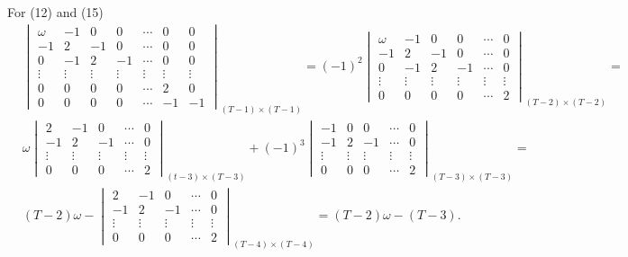 \documentclass[12pt,a4paper,hyperref]{article}
\begin{document}
For (12) and (15)
\begin{align*}
& \begin{vmatrix}
 \omega & -1     & 0      & 0      & \cdots  & 0 & 0\\
  -1    & 2      & -1     & 0      & \cdots  & 0 & 0\\
   0    & -1     & 2      & -1     &  \cdots & 0 &0 \\
\vdots  & \vdots & \vdots & \vdots & \vdots  & \vdots & \vdots \\
 0      & 0      & 0      & 0      & \cdots  & 2 &  0\\
 0      & 0      & 0      & 0      &  \cdots & -1 & -1
\end{vmatrix}
_{(T-1) \times (T-1)}
=   (-1)^{2}
\begin{vmatrix}
 \omega & -1     & 0      & 0      & \cdots  & 0  \\
  -1    & 2      & -1     & 0      & \cdots  & 0  \\
   0    & -1     & 2      & -1     &  \cdots &  0 \\
\vdots  & \vdots & \vdots & \vdots & \vdots  & \vdots  \\
 0      & 0      & 0      & 0      & \cdots  & 2
\end{vmatrix}
_{(T-2) \times (T-2)}
=  \\
& \omega
\begin{vmatrix}
 2      & -1     & 0      & \cdots  & 0  \\
 -1     & 2      & -1     &  \cdots &  0 \\
 \vdots & \vdots & \vdots & \vdots  & \vdots  \\
 0      & 0      & 0      & \cdots  & 2
\end{vmatrix}
_{(t-3) \times (T-3)} +(-1)^{3}
\begin{vmatrix}
-1     & 0      & 0      & \cdots  & 0  \\
-1     & 2      & -1     &  \cdots &  0 \\
 \vdots & \vdots & \vdots & \vdots  & \vdots  \\
  0      & 0      & 0      & \cdots  & 2
\end{vmatrix}
_{(T-3) \times (T-3)}
= \\
& (T-2)\omega -
\begin{vmatrix}
2      & -1     & 0      & \cdots  & 0  \\
 -1     & 2      & -1     &  \cdots &  0 \\
 \vdots & \vdots & \vdots & \vdots  & \vdots  \\
 0      & 0      & 0      & \cdots  & 2
\end{vmatrix}
_{(T-4) \times (T-4)}
=  (T-2)\omega - (T-3).
\end{align*}
\end{document}
